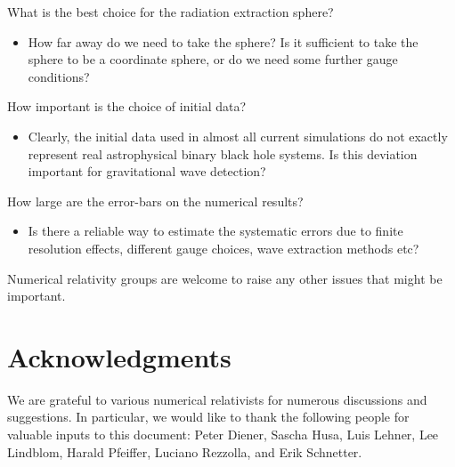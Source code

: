 \documentclass[prd,preprintnumbers,superscriptaddress,eqsecnum]{revtex4}
\numberwithin{equation}{section}
\begin{document}
What is the best choice for the radiation extraction sphere?
\begin{itemize}
\item How far away do we need to take the sphere?  Is it sufficient to
  take the sphere to be a coordinate sphere, or do we need some
  further gauge conditions?
\end{itemize}
How important is the choice of initial data?
\begin{itemize}
\item Clearly, the initial data used in almost all current simulations
  do not exactly represent real astrophysical binary black hole
  systems. Is this deviation important for gravitational wave
  detection?
\end{itemize}
How large are the error-bars on the numerical results?
\begin{itemize}
\item Is there a reliable way to estimate the systematic errors due to
  finite resolution effects, different gauge choices, wave extraction
  methods etc?  
\end{itemize}

Numerical relativity groups are welcome to raise any other issues that
might be important.


\section*{Acknowledgments}

We are grateful to various numerical relativists for numerous
discussions and suggestions. In particular, we would like to thank
the following people for valuable inputs to this document: Peter
Diener, Sascha Husa, Luis Lehner, Lee Lindblom, Harald Pfeiffer,
Luciano Rezzolla, and Erik Schnetter. 
\end{document}
